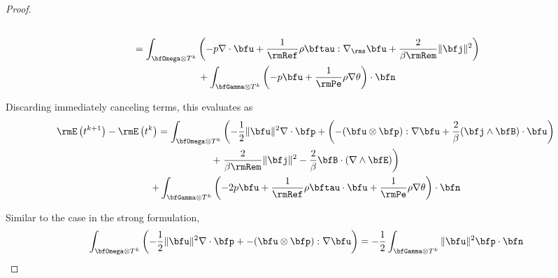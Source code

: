 \begin{proof}
\begin{align}
\begin{split}
                \end{split}  \\
                \begin{split}
                    &=  \int_{\bfOmega\otimes T^{k}}\left(- p\nabla\cdot\bfu + \frac{1}{\rmRef}\rho\bftau:\nabla_{\rms}\bfu + \frac{2}{\beta\rmRem}\|\bfj\|^{2}\right)  \\
                    &\;\;\;\;\;\;\;\;\;\;\;\;\;\;\;\;\;\;\;\;\;\;\;\;+ \int_{\bfGamma\otimes T^{k}}\left(- p\bfu + \frac{1}{\rmPe}\rho\nabla\theta\right)\cdot\bfn
                \end{split}
            \end{align}
    
            Discarding immediately canceling terms, this evaluates as
            \begin{multline}
                \rmE\left(t^{k + 1}\right) - \rmE\left(t^{k}\right)  =  \int_{\bfOmega\otimes T^{k}}\left( - \frac{1}{2}\|\bfu\|^{2}\nabla\cdot\bfp + \left(- (\bfu\otimes\bfp):\nabla\bfu + \frac{2}{\beta}(\bfj\wedge\bfB)\cdot\bfu\right)\right.  \\
                + \left.\frac{2}{\beta\rmRem}\|\bfj\|^{2} - \frac{2}{\beta}\bfB\cdot(\nabla\wedge\bfE)\right)  \\
                + \int_{\bfGamma\otimes T^{k}}\left(- 2p\bfu + \frac{1}{\rmRef}\rho\bftau\cdot\bfu + \frac{1}{\rmPe}\rho\nabla\theta\right)\cdot\bfn
            \end{multline}
            
            Similar to the case in the strong formulation,
            \begin{equation}
                \int_{\bfOmega\otimes T^{k}}\left( - \frac{1}{2}\|\bfu\|^{2}\nabla\cdot\bfp + - (\bfu\otimes\bfp):\nabla\bfu\right)  =  - \frac{1}{2}\int_{\bfGamma\otimes T^{k}}\|\bfu\|^{2}\bfp\cdot\bfn
            \end{equation}
            

\end{proof}
